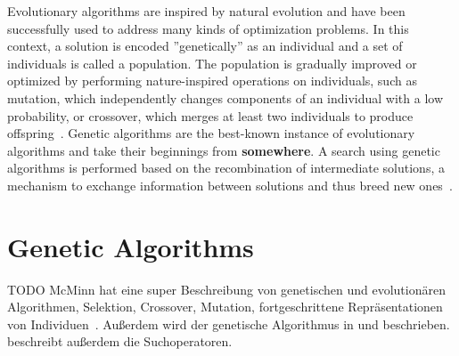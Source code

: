 \documentclass[paper=a4,%
  twoside,%
  BCOR4mm,%
  abstract=true,%
  toc=bibliography,%
  chapterprefix=true,%
  toc=bibliographynumbered,%
  open=right,%
  english,%
  pagesize=pdftex]{scrreprt}
\begin{document}
Evolutionary algorithms are inspired by natural evolution and have been successfully used to address many kinds of optimization problems. In this context, a solution is encoded ''genetically'' as an individual and a set of individuals is called a population. The population is gradually improved or optimized by performing nature-inspired operations on individuals, such as mutation, which independently changes components of an individual with a low probability, or crossover, which merges at least two individuals to produce offspring~\cite{Campos2017a}. Genetic algorithms are the best-known instance of evolutionary algorithms and take their beginnings from \textbf{somewhere}. A search using genetic algorithms is performed based on the recombination of intermediate solutions, a mechanism to exchange information between solutions and thus breed new ones~\cite{McMinn_2004}.

\section{Genetic Algorithms}
TODO McMinn hat eine super Beschreibung von genetischen und evolutionären Algorithmen, Selektion, Crossover, Mutation, fortgeschrittene Repräsentationen von Individuen~\cite{McMinn_2004}. Außerdem wird der genetische Algorithmus in \cite{Fraser2011} und \cite{Fraser_2013} beschrieben. \cite{Fraser_2013} beschreibt außerdem die Suchoperatoren.

\end{document}
